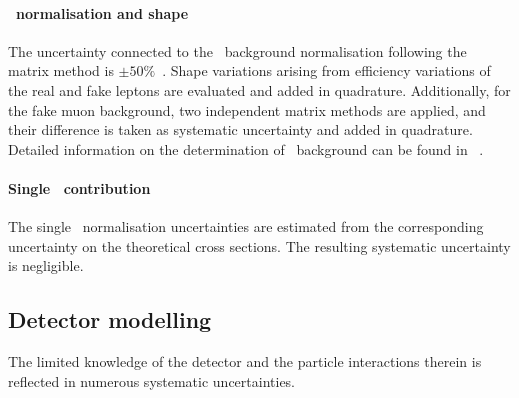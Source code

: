 \paragraph{\fake\ normalisation and shape} 
%
The uncertainty connected to the \fake\ background normalisation following the matrix method is $\pm50\%$~\cite{Aad:2010ey}. 
%
Shape variations arising from efficiency variations of the real and fake leptons are evaluated and added in quadrature. 
%
Additionally, for the fake muon background, two independent matrix methods are applied, and their difference is taken as systematic uncertainty and added in quadrature. 
%
Detailed information on the determination of \fake\ background can be found in ~\cite{ATLAS-CONF-2014-058}. 
%
%
\paragraph{Single \tquark\ contribution} 
%
The single \tquark\ normalisation uncertainties are estimated from the corresponding uncertainty on the theoretical cross sections. 
%
The resulting systematic uncertainty is negligible.










\subsection{Detector modelling} 
\label{sect:detectormodelling7TeV}
%
The limited knowledge of the detector and the particle interactions therein is reflected in numerous systematic uncertainties.
%
%
